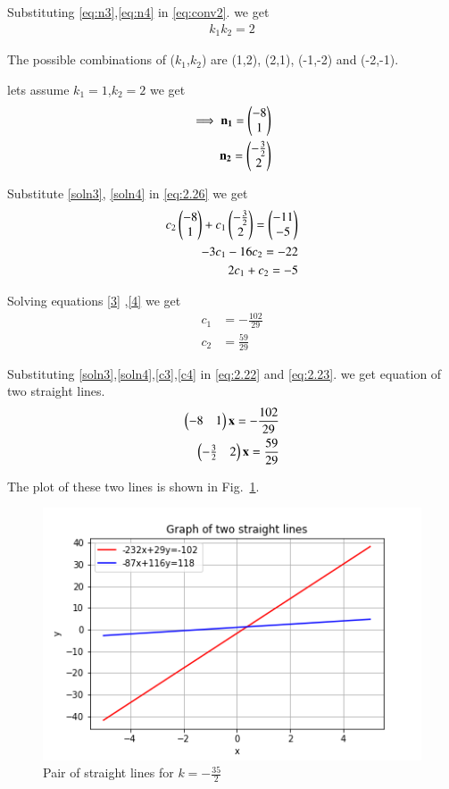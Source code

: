 \documentclass[journal,12pt,twocolumn]{IEEEtran}
\begin{document}
Substituting \eqref{eq:n3},\eqref{eq:n4} in \eqref{eq:conv2}. we get
\begin{align}
    k_1k_2=2
\end{align}

The possible combinations of ($k_1$,$k_2$) are (1,2), (2,1), (-1,-2) and (-2,-1).

lets assume $k_1=1$,$k_2=2$ we get
\begin{align}
    \implies\mathbf{n_1}=\begin{pmatrix}-8\\1\end{pmatrix}\label{soln3}\\
    \mathbf{n_2}=\begin{pmatrix}-\frac{3}{2}\\2\end{pmatrix}\label{soln4}
\end{align}

Substitute \eqref{soln3}, \eqref{soln4} in \eqref{eq:2.26} we get 
\begin{align}
    c_2\begin{pmatrix}-8\\1\end{pmatrix}+c_1\begin{pmatrix}-\frac{3}{2}\\2\end{pmatrix}=\begin{pmatrix} -11\\ -5\end{pmatrix}\\
    -3c_1-16c_2=-22\label{3}\\
    2c_1+c_2=-5\label{4}
\end{align}

Solving equations \eqref{3} ,\eqref{4} we get 
\begin{align}
    c_1&=-\frac{102}{29}\label{c3}\\
    c_2&=\frac{59}{29}\label{c4}
\end{align}

Substituting \eqref{soln3},\eqref{soln4},\eqref{c3},\eqref{c4} in \eqref{eq:2.22} and \eqref{eq:2.23}. we get equation of two straight lines.
\begin{align}
    \begin{pmatrix}-8 & 1\end{pmatrix}\mathbf{x}=-\frac{102}{29}\\
    \begin{pmatrix}-\frac{3}{2} & 2\end{pmatrix}\mathbf{x}=\frac{59}{29}
\end{align}

The plot of these two lines is shown in Fig.~\ref{fig:figure2}.
\renewcommand{\thefigure}{2}
\begin{figure}[ht!]
    \centering
    \includegraphics[width=\columnwidth]{Figure2}
    \caption{Pair of straight lines for $k=-\frac{35}{2}$}
    \label{fig:figure2}
\end{figure}
\end{document}
